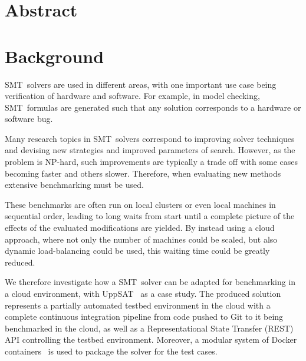 \documentclass{article}
\begin{document}


\begin{multicols}{2}

\section*{Abstract}

\textbf{ \textit {  }}

\section*{Background}

SMT~solvers are used in different areas, with one important use case being
verification of hardware and software. For example, in model checking,
SMT~formulas are generated such that any solution corresponds to a hardware or
software bug.

Many research topics in SMT~solvers correspond to improving solver techniques
and devising new strategies and improved parameters of search. However, as the
problem is NP-hard, such improvements are typically a trade off with some cases
becoming faster and others slower. Therefore, when evaluating new methods
extensive benchmarking must be used.

These benchmarks are often run on local clusters or even local machines in
sequential order, leading to long waits from start until a complete picture of
the effects of the evaluated modifications are yielded. By instead using a cloud
approach, where not only the number of machines could be scaled, but also
dynamic load-balancing could be used, this waiting time could be greatly
reduced.

We therefore investigate how a SMT~solver can be adapted for benchmarking in a
cloud environment, with UppSAT~\cite{uppsat} as a case study. The produced
solution represents a partially automated testbed environment in the cloud with
a complete continuous integration pipeline from code pushed to Git to it being
benchmarked in the cloud, as well as a Representational State Transfer (REST)
API controlling the testbed environment. Moreover, a modular system of Docker
containers~\cite{docker} is used to package the solver for the test cases.


\end{multicols}
\end{document}
